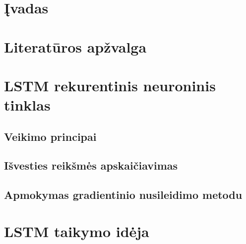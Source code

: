 \documentclass{ktu_phd_summary}
\begin{document}








\tableofcontents
\clearpage

\listoffigures
\clearpage

\listoftables
\clearpage

\section*{Įvadas}


\clearpage

\section{Literatūros apžvalga}


\clearpage



\section{LSTM rekurentinis neuroninis tinklas}


\subsection{Veikimo principai}


\subsection{Išvesties reikšmės apskaičiavimas}


\subsection{Apmokymas gradientinio nusileidimo metodu}


\clearpage

\section{LSTM taikymo idėja}

\end{document}
